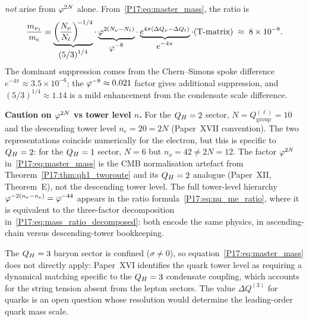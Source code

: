 \begin{remark}
\emph{not} arise from $\varphi^{2N}$ alone.
From~\eqref{P17:eq:master_mass}, the ratio is
\begin{equation}
  \frac{m_{\nu_1}}{m_e}
  = \underbrace{\left(\frac{N_\nu}{N_\ell}\right)^{\!-1/4}}_{\displaystyle(5/3)^{1/4}}
    \cdot \underbrace{\varphi^{2(N_\nu-N_\ell)}}_{\displaystyle\varphi^{-8}}
    \cdot \underbrace{e^{4\pi(\Delta Q_\nu-\Delta Q_\ell)}}_{\displaystyle e^{-4\pi}}
    \cdot (\text{T-matrix})
  \;\approx\; 8\times10^{-8}.
  \label{P17:eq:mass_ratio_decomposed}
\end{equation}
The dominant suppression comes from the Chern--Simons spoke
difference $e^{-4\pi}\approx3.5\times10^{-6}$; the
$\varphi^{-8}\approx0.021$ factor gives additional suppression, and
$(5/3)^{1/4}\approx1.14$ is a mild enhancement from the condensate
scale difference.

\smallskip\noindent\textbf{Caution on $\varphi^{2N}$ vs tower level $n$.}
For the $Q_H=2$ sector, $N=Q_{\mathrm{group}}^{(\ell)}=10$ and the
descending tower level $n_e=20=2N$ (Paper~XVII convention).
The two representations coincide numerically for the electron, but this
is specific to $Q_H=2$: for the $Q_H=1$ sector, $N=6$ but $n_\nu=42\neq2N=12$.
The factor $\varphi^{2N}$ in~\eqref{P17:eq:master_mass} is the CMB normalisation
artefact from Theorem~\ref{P17:thm:qh1_tworoute} and its $Q_H=2$ analogue
(Paper~XII, Theorem~E), not the descending tower level.
The full tower-level hierarchy $\varphi^{-2(n_\nu-n_e)}=\varphi^{-44}$
appears in the ratio formula~\eqref{P17:eq:nu_me_ratio}, where it is
equivalent to the three-factor decomposition
in~\eqref{P17:eq:mass_ratio_decomposed}: both encode the same physics,
in ascending-chain versus descending-tower bookkeeping.

\medskip
The $Q_H=3$ baryon sector is confined ($\sigma\neq0$), so
equation~\eqref{P17:eq:master_mass} does not directly apply:
Paper~XVI identifies the quark tower level as requiring a dynamical
matching specific to the $Q_H=3$ condensate coupling, which accounts
for the string tension absent from the lepton sectors.
The value $\Delta Q^{(3)}$ for quarks is an open question whose
resolution would determine the leading-order quark mass scale.
\end{remark}

